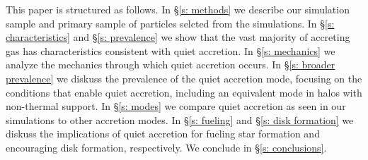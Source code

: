 \documentclass[fleqn,usenatbib]{mnras}
\begin{document}
This paper is structured as follows. 
In \S\ref{s: methods} we describe our simulation sample and primary sample of particles selcted from the simulations.
In \S\ref{s: characteristics} and \S\ref{s: prevalence} we show that the vast majority of accreting gas has characteristics consistent with quiet accretion.
In \S\ref{s: mechanics} we analyze the mechanics through which quiet accretion occurs.
In \S\ref{s: broader prevalence} we diskuss the prevalence of the quiet accretion mode, focusing on the conditions that enable quiet accretion, including an equivalent mode in halos with non-thermal support.
In \S\ref{s: modes} we compare quiet accretion as seen in our simulations to other accretion modes.
In \S\ref{s: fueling} and \S\ref{s: disk formation} we diskuss the implications of quiet accretion for fueling star formation and encouraging disk formation, respectively.
We conclude in \S\ref{s: conclusions}.


\end{document}
